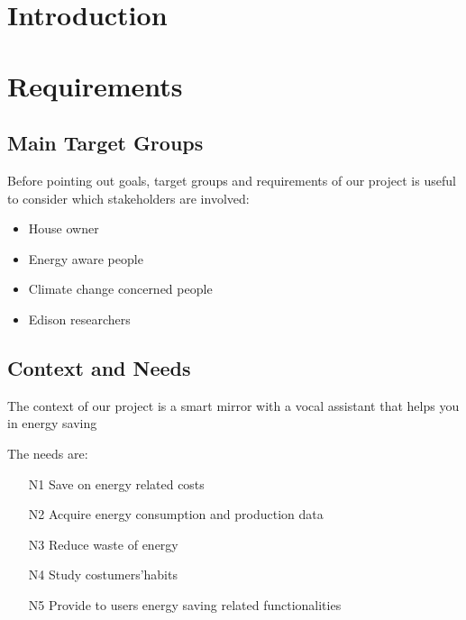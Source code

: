 \documentclass{article}
\begin{document}
    \section{Introduction}

    \newpage

    \section{Requirements}
    \subsection{Main Target Groups}
    Before pointing out goals, target groups and requirements of our project is useful to consider which stakeholders are involved:
    \begin{itemize}
        \item House owner
        \item Energy aware people
        \item Climate change concerned people
        \item Edison researchers
    \end{itemize}
    \subsection{Context and Needs}
    The context of our project is a smart mirror with a vocal assistant that helps you in energy saving %



    The needs are:
    \begin{itemize}
        \item[N1] Save on energy related costs
        \item[N2] Acquire energy consumption and production data
        \item[N3] Reduce waste of energy
        \item[N4] Study costumers'habits
        \item[N5] Provide to users energy saving related functionalities
    \end{itemize}
\end{document}
